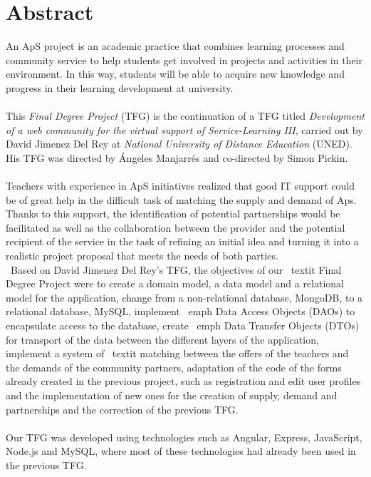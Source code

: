 \documentclass[11pt]{book}
\begin{document}
\chapter*{Abstract} 
An ApS project is an academic practice that combines learning processes and community service to help students get involved in projects and activities in their environment. In this way, students will be able to acquire new knowledge and progress in their learning development at university. \\\\
This \textit{Final Degree Project} (TFG) is the continuation of a TFG titled \textit{Development of a web community for the virtual support of Service-Learning III}, carried out by David Jimenez Del Rey at \emph{National University of Distance Education} (UNED). His TFG was directed by Ángeles Manjarrés and co-directed by Simon Pickin. \\\\
Teachers with experience in ApS initiatives realized that good IT support could be of great help in the difficult task of matching the supply and demand of Aps. Thanks to this support, the identification of potential partnerships would be facilitated as well as the collaboration between the provider and the potential recipient of the service in the task of refining an initial idea and turning it into a realistic project proposal that meets the needs of both parties. \ \\\
Based on David Jimenez Del Rey's TFG, the objectives of our \ textit {Final Degree Project} were to create a domain model, a data model and a relational model for the application, change from a non-relational database, MongoDB, to a relational database, MySQL, implement \ emph {Data Access Objects} (DAOs) to encapsulate access to the database, create \ emph {Data Transfer Objects} (DTOs) for transport of the data between the different layers of the application, implement a system of \ textit {matching} between the offers of the teachers and the demands of the community partners, adaptation of the code of the forms already created in the previous project, such as registration and edit user profiles and the implementation of new ones for the creation of supply, demand and partnerships and the correction of the previous TFG. \\\\
Our TFG was developed using technologies such as Angular, Express, JavaScript, Node.js and MySQL, where most of these technologies had already been used in the previous TFG.\\\\
\addcontentsline{toc}{chapter}{Abstract} 
\end{document}
